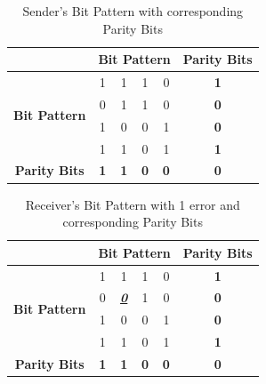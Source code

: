 \documentclass[12pt]{article}
\begin{document}
\begin{table}[]
\begin{center}
\begin{tabular}{|c|c|c|c|c|c|}
\hline
\multicolumn{1}{|l|}{}                & \multicolumn{4}{c|}{\textbf{Bit Pattern}}         & \textbf{Parity Bits} \\ \hline
\multirow{4}{*}{\textbf{Bit Pattern}} & 1          & 1          & 1          & 0          & \textbf{1}           \\ \cline{2-6} 
                                      & 0          & 1          & 1          & 0          & \textbf{0}           \\ \cline{2-6} 
                                      & 1          & 0          & 0          & 1          & \textbf{0}           \\ \cline{2-6} 
                                      & 1          & 1          & 0          & 1          & \textbf{1}           \\ \hline
\textbf{Parity Bits}                  & \textbf{1} & \textbf{1} & \textbf{0} & \textbf{0} & \textbf{0}           \\ \hline
\end{tabular}
\caption{Sender's Bit Pattern with corresponding Parity Bits}
\end{center}
\end{table}

\begin{table}[]
\begin{center}
\begin{tabular}{|c|c|c|c|c|c|}
\hline
\multicolumn{1}{|l|}{}                & \multicolumn{4}{c|}{\textbf{Bit Pattern}}                        & \textbf{Parity Bits} \\ \hline
\multirow{4}{*}{\textbf{Bit Pattern}} & 1          & 1                         & 1          & 0          & \textbf{1}           \\ \cline{2-6} 
                                      & 0          & {\ul \textit{\textbf{0}}} & 1          & 0          & \textbf{0}           \\ \cline{2-6} 
                                      & 1          & 0                         & 0          & 1          & \textbf{0}           \\ \cline{2-6} 
                                      & 1          & 1                         & 0          & 1          & \textbf{1}           \\ \hline
\textbf{Parity Bits}                  & \textbf{1} & \textbf{1}                & \textbf{0} & \textbf{0} & \textbf{0}           \\ \hline
\end{tabular}
\end{center}
\caption{Receiver's Bit Pattern with 1 error and corresponding Parity Bits}
\end{table}
\end{document}
